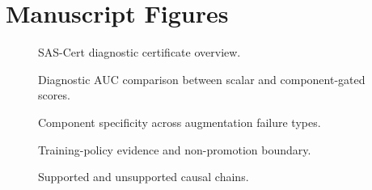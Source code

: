 \documentclass[11pt]{article}
\begin{document}
\section{Manuscript Figures}
\begin{figure}[H]
\centering

\caption{SAS-Cert diagnostic certificate overview.}
\label{fig:certificate-overview}
\end{figure}

\begin{figure}[H]
\centering

\caption{Diagnostic AUC comparison between scalar and component-gated scores.}
\label{fig:diagnostic-auc}
\end{figure}

\begin{figure}[H]
\centering

\caption{Component specificity across augmentation failure types.}
\label{fig:component-specificity}
\end{figure}

\begin{figure}[H]
\centering

\caption{Training-policy evidence and non-promotion boundary.}
\label{fig:training-policy}
\end{figure}

\begin{figure}[H]
\centering

\caption{Supported and unsupported causal chains.}
\label{fig:causal-chain}
\end{figure}



\end{document}

